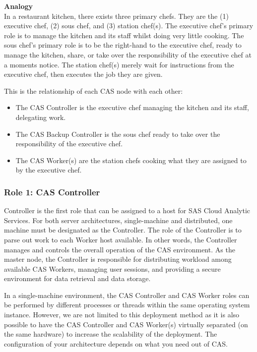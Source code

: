 \textbf{Analogy}
\\
In a restaurant kitchen, there exists three primary chefs. They are the (1) executive chef, (2) sous chef, and (3) station chef(s). The executive chef's primary role is to manage the kitchen and its staff whilst doing very little cooking. The sous chef's primary role is to be the right-hand to the executive chef, ready to manage the kitchen, share, or take over the responsibility of the executive chef at a moments notice. The station chef(s) merely wait for instructions from the executive chef, then executes the job they are given. 

This is the relationship of each CAS node with each other:
\begin{itemize}
    \item The CAS Controller is the executive chef managing the kitchen and its staff, delegating work.
    \item The CAS Backup Controller is the sous chef ready to take over the responsibility of the executive chef. 
    \item The CAS Worker(s) are the station chefs cooking what they are assigned to by the executive chef. 
\end{itemize}

\subsubsection{Role 1: CAS Controller}
Controller is the first role that can be assigned to a host for SAS Cloud Analytic Services. For both server architectures, single-machine and distributed, one machine must be designated as the Controller. The role of the Controller is to parse out work to each Worker host available. In other words, the Controller manages and controls the overall operation of the CAS environment. As the master node, the Controller is responsible for distributing workload among available CAS Workers, managing user sessions, and providing a secure environment for data retrieval and data storage. 

In a single-machine environment, the CAS Controller and CAS Worker roles can be performed by different processes or threads within the same operating system instance. However, we are not limited to this deployment method as it is also possible to have the CAS Controller and CAS Worker(s) virtually separated (on the same hardware) to increase the scalability of the deployment. The configuration of your architecture depends on what you need out of CAS.  

